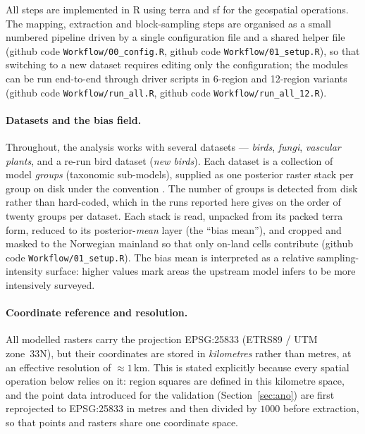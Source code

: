 All steps are implemented in \textsf{R} using \textsf{terra} and
\textsf{sf} for the geospatial operations. The mapping, extraction and
block-sampling steps are organised as a small numbered pipeline driven by
a single configuration file and a shared helper file (github code
\texttt{Workflow/00\_config.R}, github code \texttt{Workflow/01\_setup.R}),
so that switching to a new dataset requires editing only the
configuration; the modules can be run end-to-end through driver scripts
in 6-region and 12-region variants (github code \texttt{Workflow/run\_all.R},
github code \texttt{Workflow/run\_all\_12.R}).

\paragraph{Datasets and the bias field.}
Throughout, the analysis works with several datasets --- \emph{birds},
\emph{fungi}, \emph{vascular plants}, and a re-run bird dataset
(\emph{new birds}). Each dataset is a collection of model \emph{groups}
(taxonomic sub-models), supplied as one posterior raster stack per group
on disk under the convention
. The number of groups
is detected from disk rather than hard-coded, which in the runs reported
here gives on the order of twenty groups per dataset. Each stack is read,
unpacked from its packed \textsf{terra} form, reduced to its
posterior-\emph{mean} layer (the ``bias mean''), and cropped and masked to
the Norwegian mainland so that only on-land cells contribute (github code
\texttt{Workflow/01\_setup.R}). The bias mean is interpreted as a relative
sampling-intensity surface: higher values mark areas the upstream model
infers to be more intensively surveyed.

\paragraph{Coordinate reference and resolution.}
All modelled rasters carry the projection EPSG:25833 (ETRS89 / UTM
zone~33N), but their coordinates are stored in \emph{kilometres} rather
than metres, at an effective resolution of $\approx 1$\,km. This is stated
explicitly because every spatial operation below relies on it: region
squares are defined in this kilometre space, and the point data introduced
for the validation (Section~\ref{sec:ano}) are first reprojected to
EPSG:25833 in metres and then divided by $1000$ before extraction, so that
points and rasters share one coordinate space.

